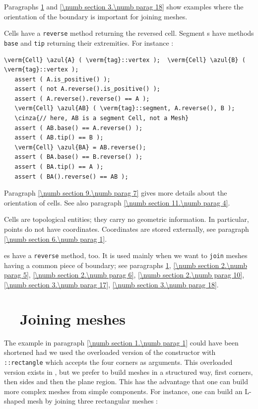 Paragraphs \ref{\numb section 1.\numb parag 3} and \ref{\numb section 3.\numb parag 18}
show examples where the orientation of the boundary is important for joining meshes.

Cells have a {\small\tt reverse} method returning the reversed cell.
Segment {\small\tt {}}s have methods {\small\tt base} and {\small\tt tip} returning their extremities.
For instance :

\begin{Verbatim}[commandchars=\\\{\},formatcom=\small\tt,baselinestretch=0.94]
   \verm{Cell} \azul{A} ( \verm{tag}::vertex );  \verm{Cell} \azul{B} ( \verm{tag}::vertex );
   assert ( A.is_positive() );
   assert ( not A.reverse().is_positive() );
   assert ( A.reverse().reverse() == A );
   \verm{Cell} \azul{AB} ( \verm{tag}::segment, A.reverse(), B );
   \cinza{// here, AB is a segment Cell, not a Mesh}
   assert ( AB.base() == A.reverse() );
   assert ( AB.tip() == B );
   \verm{Cell} \azul{BA} = AB.reverse();
   assert ( BA.base() == B.reverse() );
   assert ( BA.tip() == A );
   assert ( BA().reverse() == AB );
\end{Verbatim}

Paragraph \ref{\numb section 9.\numb parag 7} gives more details about the orientation of cells.
See also paragraph \ref{\numb section 11.\numb parag 4}.

Cells are topological entities; they carry no geometric information.
In particular, points do not have coordinates.
Coordinates are stored externally, see paragraph \ref{\numb section 6.\numb parag 1}.

{\small\tt {}}es have a {\small\tt reverse} method, too.
It is used mainly when we want to {\small\tt join} meshes having a common piece of boundary;
see paragraphs \ref{\numb section 1.\numb parag 3}, \ref{\numb section 2.\numb parag 5},
\ref{\numb section 2.\numb parag 6}, \ref{\numb section 2.\numb parag 10},
\ref{\numb section 3.\numb parag 17}, \ref{\numb section 3.\numb parag 18}.


\section{~~Joining meshes}\label{\numb section 1.\numb parag 3}

The example in paragraph \ref{\numb section 1.\numb parag 1} could have been shortened
had we used the overloaded version of the {\small\tt {}} constructor with
{\small\tt {}::rectangle} which accepts the four corners as arguments. 
This overloaded version exists in \maniFEM, but we prefer to build meshes in a structured way, 
first corners, then sides and then the plane region. 
This has the advantage that one can build more complex meshes from simple components. 
For instance, one can build an L-shaped mesh by joining three rectangular meshes :

